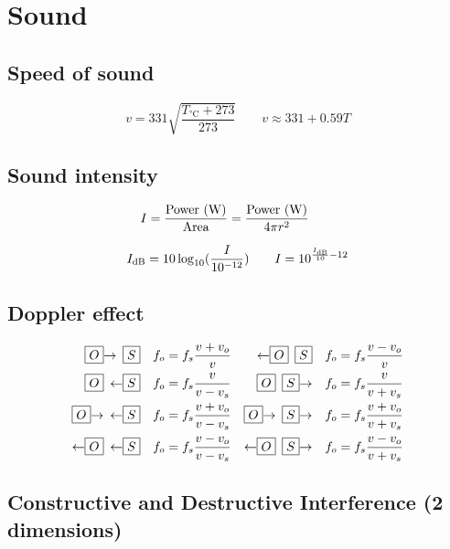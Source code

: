 \columnbreak

\section{Sound}

\subsection{Speed of sound}

\[
	v = 331 \sqrt{\frac{T_{\text{°C}}+273}{273}} \qquad v \approx 331 + 0.59T
\]

\subsection{Sound intensity}

\[
	I = \frac{\text{Power (\watt)}}{\text{Area}} = \frac{\text{Power (\watt)}}{4 \pi r^2} \qquad
\]

\[
	I_\decibel = 10 \log_{10} (\frac{I}{10^{-12}}) \qquad
	I = 10^{\frac{I_\decibel}{10} - 12}
\]

\subsection{Doppler effect}

\[\begin{aligned}
	\boxed{O}\smash{\rightarrow} \enspace \boxed{S} \quad f_o &= f_s \frac{v + v_o}{v} &
	\smash{\leftarrow}\boxed{O} \enspace \boxed{S} \quad f_o &= f_s \frac{v - v_o}{v}
	\\
	\boxed{O} \enspace \smash{\leftarrow}\boxed{S}  \quad f_o &= f_s \frac{v}{v - v_s} &
	\boxed{O} \enspace \boxed{S}\smash{\rightarrow} \quad f_o &= f_s \frac{v}{v + v_s}
	\\
	\boxed{O}\smash{\rightarrow} \enspace \smash{\leftarrow}\boxed{S} \quad f_o &= f_s \frac{v + v_o}{v - v_s} &
	\boxed{O}\smash{\rightarrow} \enspace \boxed{S}\smash{\rightarrow} \quad f_o &= f_s \frac{v + v_o}{v + v_s}
	\\
	\smash{\leftarrow}\boxed{O} \enspace \smash{\leftarrow}\boxed{S} \quad f_o &= f_s \frac{v - v_o}{v - v_s} &
	\smash{\leftarrow}\boxed{O} \enspace \boxed{S}\smash{\rightarrow} \quad f_o &= f_s \frac{v - v_o}{v + v_s}
\end{aligned}\]

\subsection{Constructive and Destructive Interference (2 dimensions)}

